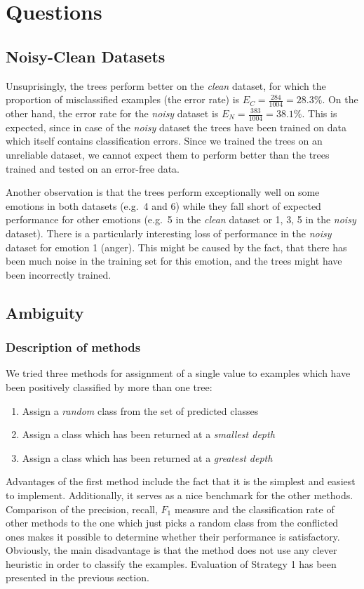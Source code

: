 \documentclass[a4paper]{article}
\begin{document}
\section{Questions}
\subsection{Noisy-Clean Datasets}

Unsuprisingly, the trees perform better on the \emph{clean} dataset, for which the proportion of misclassified examples (the error rate) is $E_C = \frac{284}{1004} = 28.3\%$. On the other hand, the error rate for the \emph{noisy} dataset is $E_N = \frac{383}{1004} = 38.1\%$. This is expected, since in case of the \emph{noisy} dataset the trees have been trained on data which itself contains classification errors. Since we trained the trees on an unreliable dataset, we cannot expect them to perform better than the trees trained and tested on an error-free data.\medskip

Another observation is that the trees perform exceptionally well on some emotions in both datasets (e.g.\ 4 and 6) while they fall short of expected performance for other emotions (e.g.\ 5 in the \emph{clean} dataset or 1, 3, 5 in the \emph{noisy} dataset). There is a particularly interesting loss of performance in the \emph{noisy} dataset for emotion 1 (anger). This might be caused by the fact, that there has been much noise in the training set for this emotion, and the trees might have been incorrectly trained.

\subsection{Ambiguity}
\subsubsection{Description of methods}

We tried three methods for assignment of a single value to examples which have been positively classified by more than one tree:
\begin{enumerate} \itemsep0pt \parskip0pt 
  \item Assign a \emph{random} class from the set of predicted classes
  \item Assign a class which has been returned at a \emph{smallest depth}
  \item Assign a class which has been returned at a \emph{greatest depth}
\end{enumerate}
Advantages of the first method include the fact that it is the simplest and easiest to implement. Additionally, it serves as a nice benchmark for the other methods. Comparison of the precision, recall, $F_1$ measure and the classification rate of other methods to the one which just picks a random class from the conflicted ones makes it possible to determine whether their performance is satisfactory. Obviously, the main disadvantage is that the method does not use any clever heuristic in order to classify the examples. Evaluation of Strategy 1 has been presented in the previous section. \medskip
\end{document}
